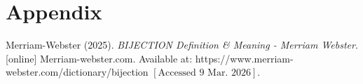 \part*{Appendix}

Merriam-Webster (2025). \textit{BIJECTION Definition \& Meaning - Merriam Webster}. [online] Merriam-webster.com. Available at: https://www.merriam-webster.com/dictionary/bijection \([\text{Accessed 9 Mar. 2026}]\).\label{cit:2}